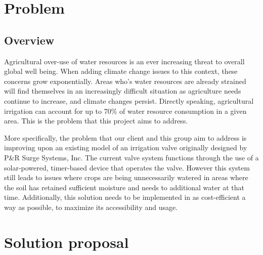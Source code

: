 \documentclass[onecolumn, draftclsnofoot,10pt, compsoc]{IEEEtran}
\begin{document}
	\section{Problem}
	
	\subsection{Overview}
	Agricultural over-use of water resources is an ever increasing threat to overall global well being.
	When adding climate change issues to this context, these concerns grow exponentially.
	Areas who's water resources are already strained will find themselves in an increasingly difficult situation as agriculture needs continue to increase, and climate changes persist.
	Directly speaking, agricultural irrigation can account for up to 70\% of water resource consumption in a given area.%
	This is the problem that this project aims to address.
	
	More specifically, the problem that our client and this group aim to address is improving upon an existing model of an irrigation valve originally designed by P\&R Surge Systems, Inc.
	The current valve system functions through the use of a solar-powered, timer-based device that operates the valve.
	However this system still leads to issues where crops are being unnecessarily watered in areas where the soil has retained sufficient moisture and needs to additional water at that time.
	Additionally, this solution needs to be implemented in as cost-efficient a way as possible, to maximize its accessibility and usage.
	
	\section{Solution proposal}
	
\end{document}
